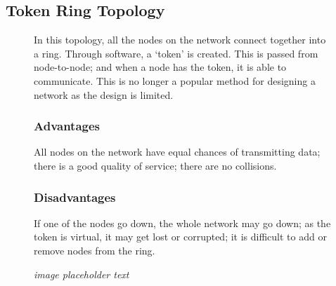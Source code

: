 \subsection*{Token Ring Topology}
\begin{figure}[H]
    \begin{minipage}[H]{0.6\textwidth}
        In this topology, all the nodes on the network connect together into a ring. Through software, a `token' is created. This is passed from node-to-node; and when a node has the token, it is able to communicate. This is no longer a popular method for designing a network as the design is limited.
        \subsubsection*{Advantages}
        All nodes on the network have equal chances of transmitting data; there is a good quality of service; there are no collisions.
        \subsubsection*{Disadvantages}
        If one of the nodes go down, the whole network may go down; as the token is virtual, it may get lost or corrupted; it is difficult to add or remove nodes from the ring.
    \end{minipage}\hfill
    \begin{minipage}[H]{0.35\textwidth}
        \textit{image placeholder text}
    \end{minipage}\hfill
\end{figure}
